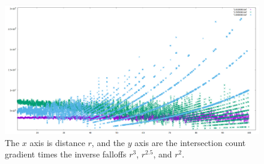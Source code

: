 \documentclass[12pt]{article}
\begin{document}
\begin{figure} 
\centering
  \includegraphics[width = 7 in]{multi_plot.png}
  \caption{
The $x$ axis is distance $r$, and the $y$ axis are the intersection count gradient times the inverse falloffs $r^3$, $r^2.5$, and $r^2$.
}
\end{figure}
\end{document}
